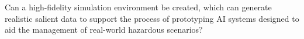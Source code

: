 Can a high-fidelity simulation environment be created,
which can generate realistic salient data to support the process of prototyping AI systems designed to aid the management of real-world hazardous scenarios?
